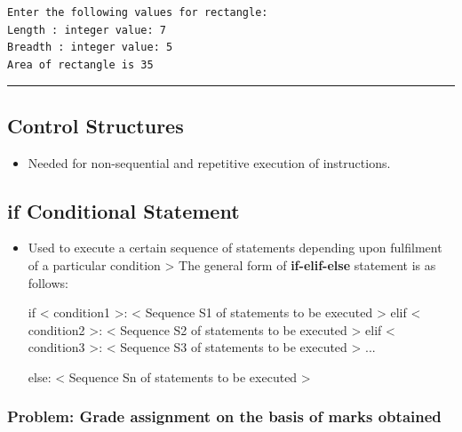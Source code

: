\documentclass[11pt]{article}
\providecommand{\tightlist}{%
      \setlength{\itemsep}{0pt}\setlength{\parskip}{0pt}}
\begin{document}
    \begin{Verbatim}[commandchars=\\\{\}]
Enter the following values for rectangle:
Length : integer value: 7
Breadth : integer value: 5
Area of rectangle is 35

    \end{Verbatim}

    \begin{center}\rule{0.5\linewidth}{\linethickness}\end{center}

\subsection{ Control Structures }\label{control-structures}

\begin{itemize}
\tightlist
\item
  Needed for non-sequential and repetitive execution of instructions.
\end{itemize}

    \subsection{ if Conditional Statement }\label{if-conditional-statement}

\begin{itemize}
\item
  Used to execute a certain sequence of statements depending upon
  fulfilment of a particular condition \textgreater{} The general form
  of \textbf{if-elif-else} statement is as follows:

  if \textless{} condition1 \textgreater{}: \textless{} Sequence S1 of
  statements to be executed \textgreater{} elif \textless{} condition2
  \textgreater{}: \textless{} Sequence S2 of statements to be executed
  \textgreater{} elif \textless{} condition3 \textgreater{}: \textless{}
  Sequence S3 of statements to be executed \textgreater{} ...

  else: \textless{} Sequence Sn of statements to be executed
  \textgreater{}
\end{itemize}

    \subsubsection{Problem: Grade assignment on the basis of marks
obtained}\label{problem-grade-assignment-on-the-basis-of-marks-obtained}
\end{document}
